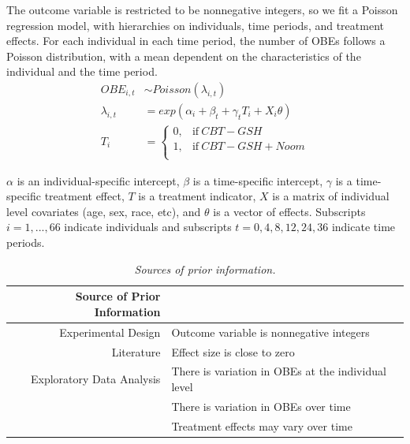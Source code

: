\documentclass[12pt, oneside]{article}
\begin{document}
The outcome variable is restricted to be nonnegative integers, so we fit a Poisson regression model, with hierarchies on individuals, time periods, and treatment effects.  For each individual in each time period, the number of OBEs follows a Poisson distribution, with a mean dependent on the characteristics of the individual and the time period.  
\begin{align}
OBE_{i,t} &\sim Poisson(\lambda_{i,t}) \\
\lambda_{i,t} &= exp(\alpha_i + \beta_t + \gamma_tT_i + X_i\theta) \\
T_i &=
    \begin{cases}
      0, & \text{if}\ CBT-GSH \\
      1, & \text{if}\ CBT-GSH + Noom \\
    \end{cases}
\end{align}

$\alpha$ is an individual-specific intercept, $\beta$ is a time-specific intercept, $\gamma$ is a time-specific treatment effect, $T$ is a treatment indicator, $X$ is a matrix of individual level covariates (age, sex, race, etc), and $\theta$ is a vector of effects. Subscripts $i = 1, ..., 66$ indicate individuals and subscripts $t = 0, 4, 8, 12, 24, 36$ indicate time periods.
\\

\begin{table}[t]
\centering
\begin{tabular}{r l}
  Source of Prior Information &  \\ 
  \hline  \vspace{0.25em}
  Experimental Design & Outcome variable is nonnegative integers \\
  \vspace{0.25em}
  Literature & Effect size is close to zero \\
  Exploratory Data Analysis & There is variation in OBEs at the individual level \\
					  & There is variation in OBEs over time \\
                                            & Treatment effects may vary over time \\
    \hline
\end{tabular}
\caption{\emph{Sources of prior information.}}
\end{table}
\end{document}
